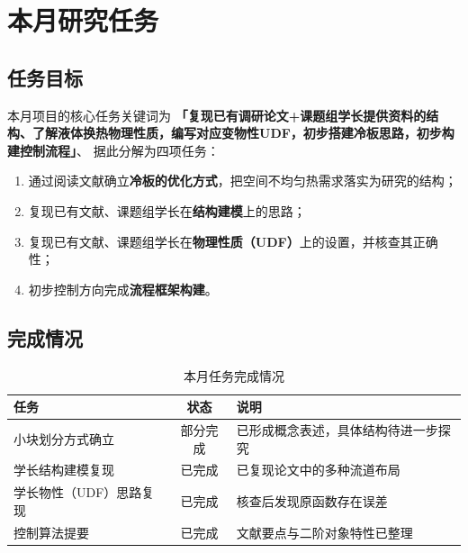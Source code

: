 \documentclass[stage1,fontset=fandol]{ydzjreport}
\begin{document}
	\makestageonehead
	
	\section{本月研究任务}
	
	\subsection{任务目标}
	
	本月项目的核心任务关键词为
	\textbf{「复现已有调研论文+课题组学长提供资料的结构、了解液体换热物理性质，编写对应变物性UDF，初步搭建冷板思路，初步构建控制流程」}、
	据此分解为四项任务：
	
	\begin{enumerate}
		\item 通过阅读文献确立\textbf{冷板的优化方式}，把空间不均匀热需求落实为研究的结构；
		\item 复现已有文献、课题组学长在\textbf{结构建模}上的思路；
		\item 复现已有文献、课题组学长在\textbf{物理性质（UDF）}上的设置，并核查其正确性；
		\item 初步控制方向完成\textbf{流程框架构建}。
	\end{enumerate}
	
	\subsection{完成情况}
	
	\begin{table}[H]
		\centering
		\caption{本月任务完成情况}
		\label{tab:tasks}
		\begin{tabularx}{\textwidth}{@{}Y c Y@{}}
			\toprule
			 任务 & 状态 & 说明 \\
			\midrule
			小块划分方式确立 & 部分完成 & 已形成概念表述，具体结构待进一步探究 \\
			学长结构建模复现 & 已完成 & 已复现论文中的多种流道布局 \\
			学长物性（UDF）思路复现 & 已完成 & 核查后发现原函数存在误差 \\
			控制算法提要 & 已完成 & 文献要点与二阶对象特性已整理 \\
			\bottomrule
		\end{tabularx}
	\end{table}
	
	
\end{document}
